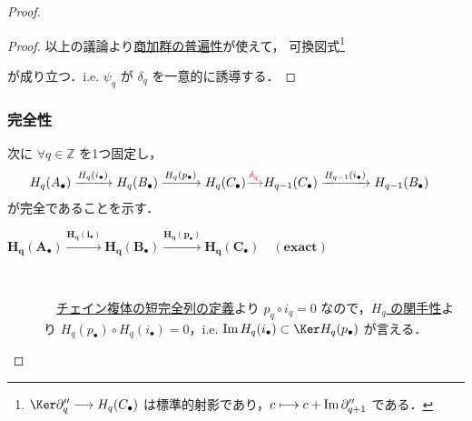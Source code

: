 \documentclass[algtopo_main]{subfiles}
\begin{document}
\begin{proof}
\begin{proof}
        以上の議論より\hyperref[lem:quomod-univ]{商加群の普遍性}が使えて，
        可換図式\footnote{$\Ker \partial''_q \lto H_q(C_\bullet)$ は標準的射影であり，$c \longmapsto c + \Im \partial''_{q+1}$ である．}
        \begin{center}
        \end{center}
        が成り立つ．i.e. $\psi_q$ が $\delta_q$ を一意的に誘導する．
    \end{proof}

\hrulefill

\subsubsection{完全性}

次に $\forall q \in \mathbb{Z}$ を1つ固定し，
\begin{align}
    H_q(A_\bullet) \xrightarrow{H_q(i_\bullet)} H_q(B_\bullet) \xrightarrow{H_q(p_\bullet)} H_q(C_\bullet)
    \textcolor{red}{\xrightarrow{\delta_q}} &H_{q-1}(C_\bullet) \xrightarrow{H_{q-1}(i_\bullet)} H_{q-1}(B_\bullet)
\end{align}
が完全であることを示す．

\begin{description}
    \item[$\bm{H_q(A_\bullet) \xrightarrow{H_q(i_\bullet)} H_q(B_\bullet) \xrightarrow{H_q(p_\bullet)} H_q(C_\bullet) \quad (\text{exact})}$] 　
    
    　\hyperref[def:chain-exact]{チェイン複体の短完全列の定義}より $p_q \circ i_q = 0$ なので，\hyperref[prop:Hq-functoriality]{$H_q$ の関手性}より $H_q(p_\bullet) \circ H_q(i_\bullet) = 0$，i.e. $\Im  H_q(i_\bullet) \subset \Ker H_q(p_\bullet)$ が言える．


\end{description}
\end{proof}
\end{document}
